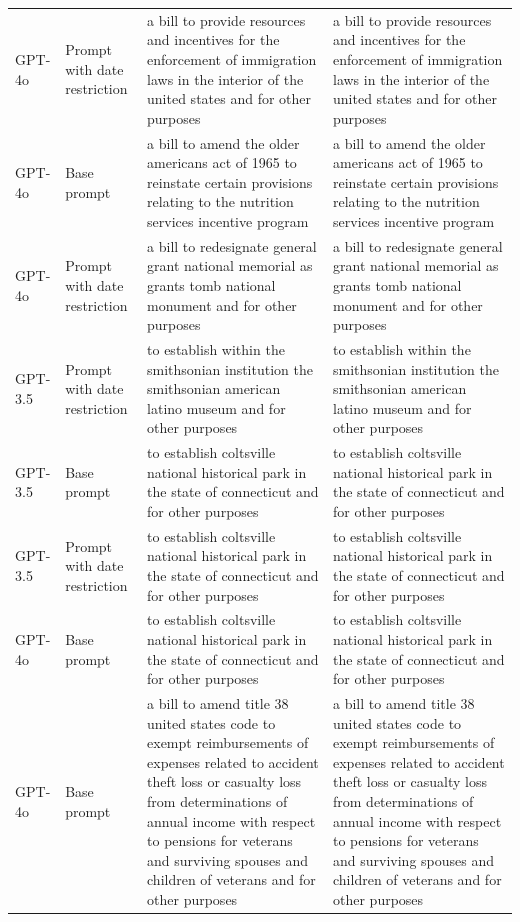 \begin{longtable}{>{\raggedright\arraybackslash}p{1.4cm}>{\raggedright\arraybackslash}p{1.4cm}>{\raggedright\arraybackslash}p{5.5cm}>{\raggedright\arraybackslash}p{5.5cm}}
GPT-4o & Prompt with date restriction & a bill to provide resources and incentives for the enforcement of immigration laws in the interior of the united states and for other purposes & a bill to provide resources and incentives for the enforcement of immigration laws in the interior of the united states and for other purposes\\
GPT-4o & Base prompt & a bill to amend the older americans act of 1965 to reinstate certain provisions relating to the nutrition services incentive program & a bill to amend the older americans act of 1965 to reinstate certain provisions relating to the nutrition services incentive program\\
GPT-4o & Prompt with date restriction & a bill to redesignate general grant national memorial as grants tomb national monument and for other purposes & a bill to redesignate general grant national memorial as grants tomb national monument and for other purposes\\
GPT-3.5 & Prompt with date restriction & to establish within the smithsonian institution the smithsonian american latino museum and for other purposes & to establish within the smithsonian institution the smithsonian american latino museum and for other purposes\\
GPT-3.5 & Base prompt & to establish coltsville national historical park in the state of connecticut and for other purposes & to establish coltsville national historical park in the state of connecticut and for other purposes\\
GPT-3.5 & Prompt with date restriction & to establish coltsville national historical park in the state of connecticut and for other purposes & to establish coltsville national historical park in the state of connecticut and for other purposes\\
GPT-4o & Base prompt & to establish coltsville national historical park in the state of connecticut and for other purposes & to establish coltsville national historical park in the state of connecticut and for other purposes\\
GPT-4o & Base prompt & a bill to amend title 38 united states code to exempt reimbursements of expenses related to accident theft loss or casualty loss from determinations of annual income with respect to pensions for veterans and surviving spouses and children of veterans and for other purposes & a bill to amend title 38 united states code to exempt reimbursements of expenses related to accident theft loss or casualty loss from determinations of annual income with respect to pensions for veterans and surviving spouses and children of veterans and for other purposes\\

\end{longtable}
